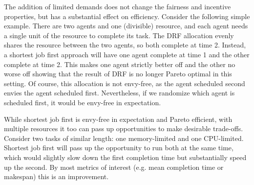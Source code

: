 \documentclass[letterpaper]{article} %
\theoremstyle{definition}
\begin{document}
The addition of limited demands does not change the fairness and incentive properties, but has a substantial effect on efficiency.  Consider the following simple example.  There are two agents and one (divisible) resource, and each agent needs a single unit of the resource to complete its task.  The DRF allocation evenly shares the resource between the two agents, so both complete at time 2.  Instead, a shortest job first approach will have one agent complete at time 1 and the other complete at time 2.  This makes one agent strictly better off and the other no worse off showing that the result of DRF is no longer Pareto optimal in this setting.  Of course, this allocation is not envy-free, as the agent scheduled second envies the agent scheduled first.  Nevertheless, if we randomize which agent is scheduled first, it would be envy-free in expectation.

While shortest job first is envy-free in expectation and Pareto efficient, with multiple resources it too can pass up opportunities to make desirable trade-offs.  Consider two tasks of similar length: one memory-limited and one CPU-limited.  Shortest job first will pass up the opportunity to run both at the same time, which would slightly slow down the first completion time but substantially speed up the second.  By most metrics of interest (e.g. mean completion time or makespan) this is an improvement.
\end{document}
